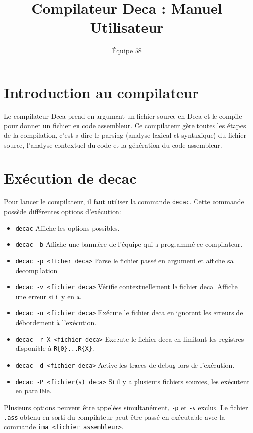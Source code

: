 \documentclass[a4paper]{article}
\begin{document}
\title{Compilateur Deca : Manuel Utilisateur}
\author{\'Equipe 58}
\maketitle
\section{Introduction au compilateur}
Le compilateur Deca prend en argument un fichier source en Deca et le compile pour donner un fichier en code assembleur. \newline
Ce compilateur gère toutes les étapes de la compilation, c'est-a-dire le parsing (analyse lexical et syntaxique) du fichier source, l'analyse contextuel du code et la génération du code assembleur. 
\section{Ex\'ecution de decac}
Pour lancer le compilateur, il faut utiliser la commande \texttt{decac}. Cette commande possède différentes options d'exécution:
\begin{itemize}
    \item \texttt{decac}
    \newline
    Affiche les options possibles.
    \item \texttt{decac -b}
    \newline
    Affiche une banni\`ere de l'\'equipe qui a programm\'e ce compilateur.
    \item \texttt{decac -p <ficher deca>} \newline
    Parse le fichier pass\'e en argument et affiche sa decompilation.
    \item \texttt{decac -v <fichier deca>}
    \newline
    V\'erifie contextuellement le fichier deca. Affiche une erreur si il y en a.
    \item \texttt{decac -n <fichier deca>}
    \newline
    Exécute le fichier deca en ignorant les erreurs de débordement \`a l'exécution.
    \item \texttt{decac -r X <fichier deca>}
    \newline
    Execute le fichier deca en limitant les registres disponible \`a \texttt{R\{0\}...R\{X\}}.
    \item \texttt{decac -d <fichier deca>}
    \newline
    Active les traces de debug lors de l'exécution.
    \item{\texttt{decac -P <fichier(s) deca>}}
    \newline
    Si il y a plusieurs fichiers sources, les exécutent en parallèle.
\end{itemize}
Plusieurs options peuvent être appelées simultanément, \texttt{-p} et \texttt{-v} exclus.
Le fichier \texttt{.ass} obtenu en sorti du compilateur peut \^etre pass\'e en exécutable avec la commande \texttt{ima <fichier assembleur>}.
\end{document}
